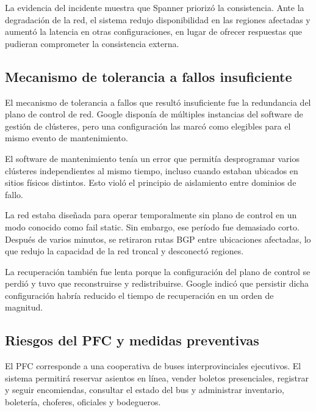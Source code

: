 \documentclass[11pt]{article}
\begin{document}
La evidencia del incidente muestra que Spanner priorizó la consistencia. Ante la degradación
de la red, el sistema redujo disponibilidad en las regiones afectadas y aumentó la latencia en
otras configuraciones, en lugar de ofrecer respuestas que pudieran comprometer la consistencia
externa. \cite{googlecloud19009,corbett2013spanner}

\subsection{Mecanismo de tolerancia a fallos insuficiente}

El mecanismo de tolerancia a fallos que resultó insuficiente fue la redundancia del plano de
control de red. Google disponía de múltiples instancias del software de gestión de clústeres,
pero una configuración las marcó como elegibles para el mismo evento de mantenimiento.
\cite{googlecloud19009}

El software de mantenimiento tenía un error que permitía desprogramar varios clústeres
independientes al mismo tiempo, incluso cuando estaban ubicados en sitios físicos distintos.
Esto violó el principio de aislamiento entre dominios de fallo. \cite{googlecloud19009}

La red estaba diseñada para operar temporalmente sin plano de control en un modo conocido como
fail static. Sin embargo, ese período fue demasiado corto. Después de varios minutos, se
retiraron rutas BGP entre ubicaciones afectadas, lo que redujo la capacidad de la red troncal
y desconectó regiones. \cite{googlecloud19009}

La recuperación también fue lenta porque la configuración del plano de control se perdió y
tuvo que reconstruirse y redistribuirse. Google indicó que persistir dicha configuración
habría reducido el tiempo de recuperación en un orden de magnitud. \cite{googlecloud19009}

\endgroup

\subsection{Riesgos del PFC y medidas preventivas}

El PFC corresponde a una cooperativa de buses interprovinciales ejecutivos. El sistema
permitirá reservar asientos en línea, vender boletos presenciales, registrar y seguir
encomiendas, consultar el estado del bus y administrar inventario, boletería, choferes,
oficiales y bodegueros. \cite{googlecloud19009}
\end{document}
